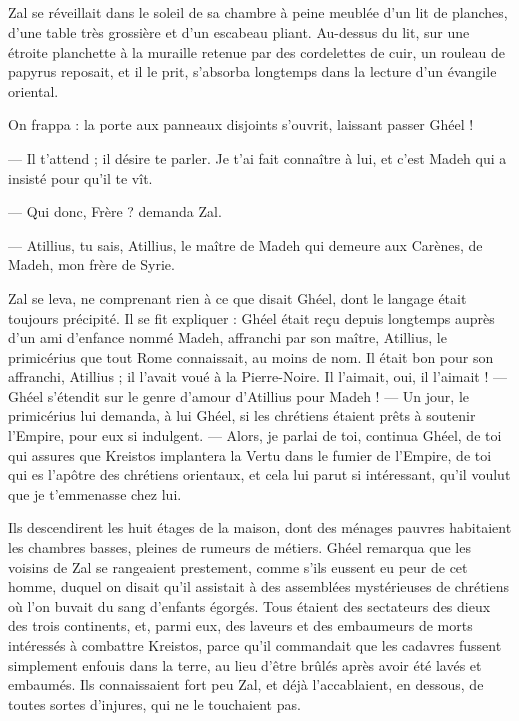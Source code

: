 \documentclass[a4paper, 11pt, oneside, polutonikogreek, french]{article}
\begin{document}
\subsection{}
\paragraph{}
Zal se réveillait dans le soleil de sa chambre à peine meublée d'un lit de planches, d'une table très grossière et d'un escabeau pliant. Au-dessus du lit, sur une étroite planchette à la muraille retenue par des cordelettes de cuir, un rouleau de papyrus reposait, et il le prit, s'absorba longtemps dans la lecture d'un évangile oriental.

On frappa : la porte aux panneaux disjoints s'ouvrit, laissant passer Ghéel !

--- Il t'attend ; il désire te parler. Je t'ai fait connaître à lui, et c'est Madeh qui a insisté pour qu'il te vît.

--- Qui donc, Frère ? demanda Zal.

--- Atillius, tu sais, Atillius, le maître de Madeh qui demeure aux Carènes, de Madeh, mon frère de Syrie.

Zal se leva, ne comprenant rien à ce que disait Ghéel, dont le langage était toujours précipité. Il se fit expliquer : Ghéel était reçu depuis longtemps auprès d'un ami d'enfance nommé Madeh, affranchi par son maître, Atillius, le primicérius que tout Rome connaissait, au moins de nom. Il était bon pour son affranchi, Atillius ; il l'avait voué à la Pierre-Noire. Il l'aimait, oui, il l’aimait ! --- Ghéel s'étendit sur le genre d'amour d'Atillius pour Madeh ! --- Un jour, le primicérius lui demanda, à lui Ghéel, si les chrétiens étaient prêts à soutenir l'Empire, pour eux si indulgent. --- Alors, je parlai de toi, continua Ghéel, de toi qui assures que Kreistos implantera la Vertu dans le fumier de l'Empire, de toi qui es l'apôtre des chrétiens orientaux, et cela lui parut si intéressant, qu'il voulut que je t'emmenasse chez lui.

Ils descendirent les huit étages de la maison, dont des ménages pauvres habitaient les chambres basses, pleines de rumeurs de métiers. Ghéel remarqua que les voisins de Zal se rangeaient prestement, comme s'ils eussent eu peur de cet homme, duquel on disait qu'il assistait à des assemblées mystérieuses de chrétiens où l'on buvait du sang d'enfants égorgés. Tous étaient des sectateurs des dieux des trois continents, et, parmi eux, des laveurs et des embaumeurs de morts intéressés à combattre Kreistos, parce qu'il commandait que les cadavres fussent simplement enfouis dans la terre, au lieu d'être brûlés après avoir été lavés et embaumés. Ils connaissaient fort peu Zal, et déjà l'accablaient, en dessous, de toutes sortes d'injures, qui ne le touchaient pas.
\end{document}
